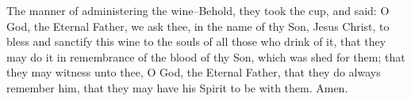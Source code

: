 \bchapter
\bverse \iffalse The manner of administering the wine--Behold, they took the cup, and said: \fi
The manner of administering the wine--Behold, they took the cup, and said:
\bverse \iffalse O God, the Eternal Father, we ask thee, in the name of thy Son, Jesus Christ, to bless and sanctify this wine to the souls of all those who drink of it, that they may do it in remembrance of the blood of thy Son, which was shed for them; that they may witness unto thee, O God, the Eternal Father, that they do always remember him, that they may have his Spirit to be with them.  Amen. \fi
O God, the Eternal Father, we ask thee, in the name of thy Son, Jesus Christ, to bless and sanctify this wine to the souls of all those who drink of it, that they may do it in remembrance of the blood of thy Son, which was shed for them; that they may witness unto thee, O God, the Eternal Father, that they do always remember him, that they may have his Spirit to be with them.  Amen.

